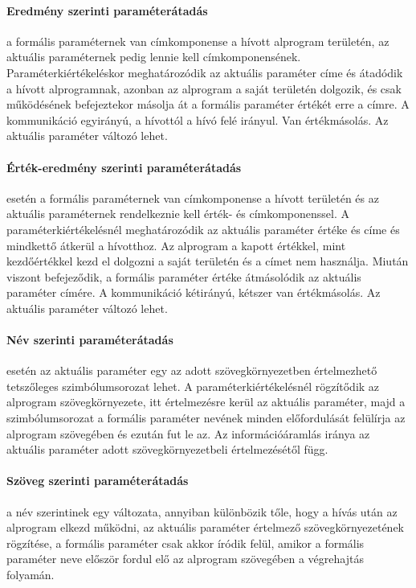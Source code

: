 \paragraph{Eredmény szerinti paraméterátadás} a formális paraméternek van címkomponense a hívott alprogram területén, az aktuális paraméternek pedig lennie kell címkomponensének. Paraméterkiértékeléskor meghatározódik az aktuális paraméter címe és átadódik a hívott alprogramnak, azonban az alprogram a saját területén dolgozik, és csak működésének befejeztekor másolja át a formális paraméter értékét erre a címre. A kommunikáció egyirányú, a hívottól a hívó felé irányul. Van értékmásolás. Az aktuális paraméter változó lehet.

\paragraph{Érték-eredmény szerinti paraméterátadás} esetén a formális paraméternek van címkomponense a hívott területén és az aktuális paraméternek rendelkeznie kell érték- és címkomponenssel. A paraméterkiértékelésnél meghatározódik az aktuális paraméter értéke és címe és mindkettő átkerül a hívotthoz. Az alprogram a kapott értékkel, mint kezdőértékkel kezd el dolgozni a saját területén és a címet nem használja. Miután viszont befejeződik, a formális paraméter értéke átmásolódik az aktuális paraméter címére. A kommunikáció kétirányú, kétszer van értékmásolás. Az aktuális paraméter változó lehet.

\paragraph{Név szerinti paraméterátadás} esetén az aktuális paraméter egy az adott szövegkörnyezetben értelmezhető tetszőleges szimbólumsorozat lehet. A paraméterkiértékelésnél rögzítődik az alprogram szövegkörnyezete, itt értelmezésre kerül az aktuális paraméter, majd a szimbólumsorozat a formális paraméter nevének minden előfordulását felülírja az alprogram szövegében és ezután fut le az. Az információáramlás iránya az aktuális paraméter adott szövegkörnyezetbeli értelmezésétől függ. 

\paragraph{Szöveg szerinti paraméterátadás} a név szerintinek egy változata, annyiban különbözik tőle, hogy a hívás után az alprogram elkezd működni, az aktuális paraméter értelmező szövegkörnyezetének rögzítése, a formális paraméter csak akkor íródik felül, amikor a formális paraméter neve először fordul elő az alprogram szövegében a végrehajtás folyamán.

